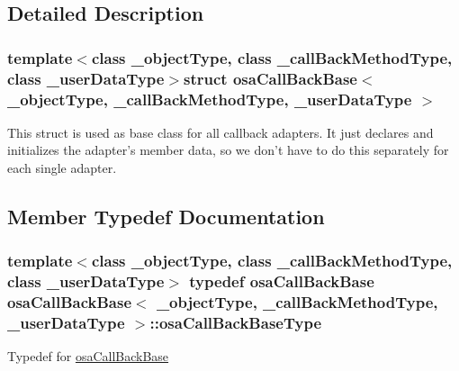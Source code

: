 \subsection{Detailed Description}
\subsubsection*{template$<$class \-\_\-object\-Type, class \-\_\-call\-Back\-Method\-Type, class \-\_\-user\-Data\-Type$>$struct osa\-Call\-Back\-Base$<$ \-\_\-object\-Type, \-\_\-call\-Back\-Method\-Type, \-\_\-user\-Data\-Type $>$}

This struct is used as base class for all callback adapters. It just declares and initializes the adapter's member data, so we don't have to do this separately for each single adapter. 

\subsection{Member Typedef Documentation}
\hypertarget{structosa_call_back_base_ac0992ce98eed821dbeae7d6b41bc6682}{
\subsubsection[{osa\-Call\-Back\-Base\-Type}]{\setlength{\rightskip}{0pt plus 5cm}template$<$class \-\_\-object\-Type, class \-\_\-call\-Back\-Method\-Type, class \-\_\-user\-Data\-Type$>$ typedef {\bf osa\-Call\-Back\-Base} {\bf osa\-Call\-Back\-Base}$<$ \-\_\-object\-Type, \-\_\-call\-Back\-Method\-Type, \-\_\-user\-Data\-Type $>$\-::{\bf osa\-Call\-Back\-Base\-Type}}}\label{structosa_call_back_base_ac0992ce98eed821dbeae7d6b41bc6682}
Typedef for \hyperlink{structosa_call_back_base}{osa\-Call\-Back\-Base} 

